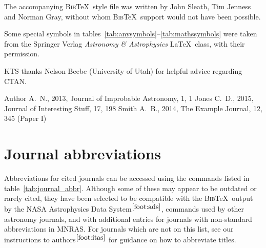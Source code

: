 \documentclass[a4paper,fleqn,usenatbib,useAMS]{mnras}
\newcommand{\bibtex}{\textsc{Bib}\!\TeX} %
\begin{document}
The accompanying \bibtex\ style file was written by John Sleath, Tim Jenness and Norman Gray, without whom \bibtex\ support would not have been possible.

Some special symbols in tables~\ref{tab:anysymbols}--\ref{tab:mathssymbols} were taken from the Springer Verlag \textit{Astronomy \& Astrophysics} \LaTeX\ class, with their permission.

KTS thanks Nelson Beebe (University of Utah) for helpful advice regarding CTAN.




%


\begin{thebibliography}{99}
Author A.~N., 2013, Journal of Improbable Astronomy, 1, 1
Jones C.~D., 2015, Journal of Interesting Stuff, 17, 198
Smith A.~B., 2014, The Example Journal, 12, 345 (Paper I)
\end{thebibliography}




\appendix
\section{Journal abbreviations}
\label{sec:abbreviations}
Abbreviations for cited journals can be accessed using the commands listed in table~\ref{tab:journal_abbr}.
Although some of these may appear to be outdated or rarely cited, they have been selected to be compatible with the \bibtex\ output by the NASA Astrophysics Data System$^{\ref{foot:ads}}$, commands used by other astronomy journals, and with additional entries for journals with non-standard abbreviations in MNRAS.
For journals which are not on this list, see our instructions to authors$^{\ref{foot:itas}}$ for guidance on how to abbreviate titles.
\end{document}
